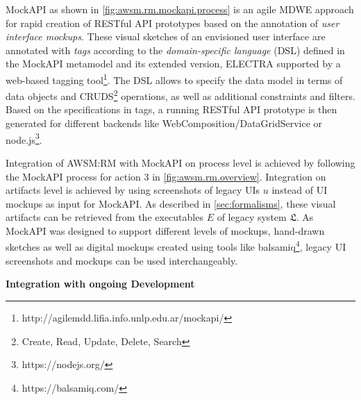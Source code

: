 MockAPI as shown in \cref{fig:awsm.rm.mockapi.process} is an agile MDWE approach for rapid creation of RESTful API prototypes based on the annotation of \emph{user interface mockups}.
These visual sketches of an envisioned user interface are annotated with \emph{tags} according to the \emph{domain-specific language} (DSL) defined in the MockAPI metamodel \autocite{Rivero2013} and its extended version, ELECTRA \autocite{Rivero2014Electra} supported by a web-based tagging tool\footnote{http://agilemdd.lifia.info.unlp.edu.ar/mockapi/}.
The DSL allows to specify the data model in terms of data objects and CRUDS\footnote{Create, Read, Update, Delete, Search} operations, as well as additional constraints and filters.
Based on the specifications in tags, a running RESTful API prototype is then generated for different backends like WebComposition/DataGridService \autocite{Chudnovskyy2010DGS} or node.js\footnote{https://nodejs.org/}.

Integration of AWSM:RM with MockAPI on process level is achieved by following the MockAPI process for action 3 in \cref{fig:awsm.rm.overview}.
Integration on artifacts level is achieved by using screenshots of legacy UIs \(u\) instead of UI mockups as input for MockAPI.
As described in \cref{sec:formalisms}, these visual artifacts can be retrieved from the executables \(E\) of legacy system \(\mathfrak{L}\).
As MockAPI was designed to support different levels of mockups, hand-drawn sketches as well as digital mockups created using tools like balsamiq\footnote{https://balsamiq.com/}, legacy UI screenshots and mockups can be used interchangeably.

\textbf{Integration with ongoing Development}

